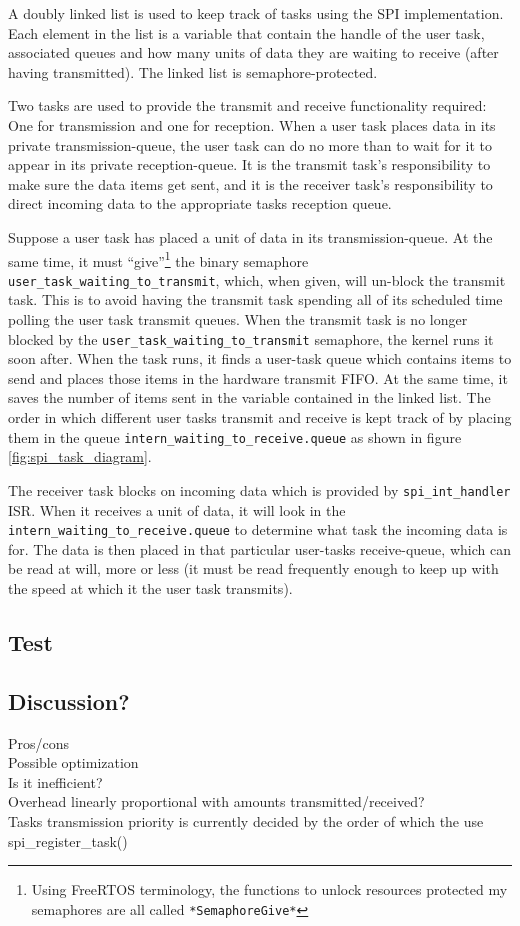 A doubly linked list is used to keep track of tasks using the SPI implementation. Each element in the list is a variable that contain the handle of the user task, associated queues and how many units of data they are waiting to receive (after having transmitted). The linked list is semaphore-protected.

Two tasks are used to provide the transmit and receive functionality required: One for transmission and one for reception. When a user task places data in its private transmission-queue, the user task can do no more than to wait for it to appear in its private reception-queue. It is the transmit task's responsibility to make sure the data items get sent, and it is the receiver task's responsibility to direct incoming data to the appropriate tasks reception queue.

Suppose a user task has placed a unit of data in its transmission-queue. At the same time, it must ``give''\footnote{Using FreeRTOS terminology, the functions to unlock resources protected my semaphores are all called \texttt{*SemaphoreGive*}} the binary semaphore \texttt{user\_task\_waiting\_to\_transmit}, which, when given, will un-block the transmit task. This is to avoid having the transmit task spending all of its scheduled time polling the user task transmit queues. When the transmit task is no longer blocked by the \texttt{user\_task\_waiting\_to\_transmit} semaphore, the kernel runs it soon after. When the task runs, it finds a user-task queue which contains items to send and places those items in the hardware transmit FIFO. At the same time, it saves the number of items sent in the variable contained in the linked list. The order in which different user tasks transmit and receive is kept track of by placing them in the queue \texttt{intern\_waiting\_to\_receive.queue} as shown in figure \ref{fig:spi_task_diagram}.

The receiver task blocks on incoming data which is provided by \texttt{spi\_int\_handler} ISR. When it receives a unit of data, it will look in the \texttt{intern\_waiting\_to\_receive.queue} to determine what task the incoming data is for. The data is then placed in that particular user-tasks receive-queue, which can be read at will, more or less (it must be read frequently enough to keep up with the speed at which it the user task transmits).




\subsection{Test}


\subsection{Discussion?}
Pros/cons\\
Possible optimization\\
Is it inefficient?\\
Overhead linearly proportional with amounts transmitted/received?\\
Tasks transmission priority is currently decided by the order of which the use spi\_register\_task()
